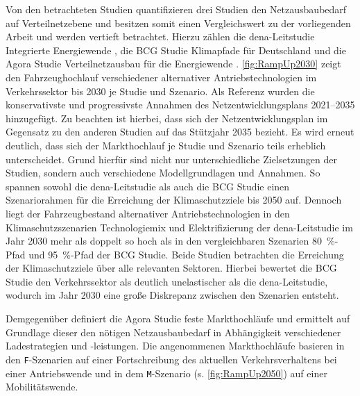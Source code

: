 

Von den betrachteten Studien quantifizieren drei Studien den Netzausbaubedarf auf Verteilnetzebene und besitzen somit einen Vergleichswert zu der vorliegenden Arbeit und werden vertieft betrachtet.
Hierzu zählen die dena-Leitstudie \glqq Integrierte Energiewende\grqq{} \cite{DEAGH2018}, die BCG Studie \glqq Klimapfade für Deutschland\grqq{} \cite{BCG2018} und die Agora Studie \glqq Verteilnetzausbau für die Energiewende\grqq{} \cite{Agora2019}.
\autoref{fig:RampUp2030} zeigt den Fahrzeughochlauf verschiedener alternativer Antriebstechnologien im Verkehrssektor bis \num{2030} je Studie und Szenario.
Als Referenz wurden die konservativste und progressivste Annahmen des Netzentwicklungsplans \numrange[range-phrase=~{--}~]{2021}{2035} \cite{BNetzA2020} hinzugefügt.
Zu beachten ist hierbei, dass sich der Netzentwicklungsplan im Gegensatz zu den anderen Studien auf das Stützjahr \num{2035} bezieht.
Es wird erneut deutlich, dass sich der Markthochlauf je Studie und Szenario teils erheblich unterscheidet.
Grund hierfür sind nicht nur unterschiedliche Zielsetzungen der Studien, sondern auch verschiedene Modellgrundlagen und Annahmen.
So spannen sowohl die dena-Leitstudie als auch die BCG Studie einen Szenariorahmen für die Erreichung der Klimaschutzziele bis \num{2050} auf.
Dennoch liegt der Fahrzeugbestand alternativer Antriebstechnologien in den Klimaschutzszenarien \glqq Technologiemix\grqq{} und \glqq Elektrifizierung\grqq{} der dena-Leitstudie im Jahr 2030 mehr als doppelt so hoch als in den vergleichbaren Szenarien \glqq \SI{80}{\percent}-Pfad\grqq{} und \glqq \SI{95}{\percent}-Pfad\grqq{} der BCG Studie.
Beide Studien betrachten die Erreichung der Klimaschutzziele über alle relevanten Sektoren.
Hierbei bewertet die BCG Studie den Verkehrssektor als deutlich unelastischer als die dena-Leitstudie, wodurch im Jahr \num{2030} eine große Diskrepanz zwischen den Szenarien entsteht.\medskip

Demgegenüber definiert die Agora Studie feste Markthochläufe und ermittelt auf Grundlage dieser den nötigen Netzausbaubedarf in Abhängigkeit verschiedener Ladestrategien und -leistungen.
Die angenommenen Markthochläufe basieren in den \texttt{F}-Szenarien auf einer Fortschreibung des aktuellen Verkehrsverhaltens bei einer Antriebswende und in dem \texttt{M}-Szenario (s. \autoref{fig:RampUp2050}) auf einer Mobilitätswende.



